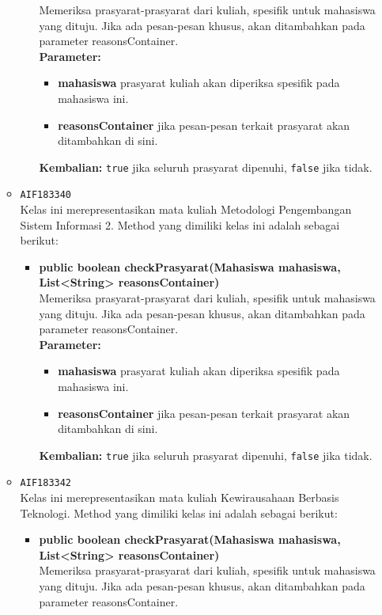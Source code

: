 \begin{enumerate}
\begin{itemize}
\begin{itemize}
Memeriksa prasyarat-prasyarat dari kuliah, spesifik untuk mahasiswa yang dituju. Jika ada pesan-pesan khusus, akan ditambahkan pada parameter reasonsContainer.\\
\textbf{Parameter:}
\begin{itemize}
\item \textbf{mahasiswa} prasyarat kuliah akan diperiksa spesifik pada mahasiswa ini.
\item \textbf{reasonsContainer} jika pesan-pesan terkait prasyarat akan ditambahkan di sini.
\end{itemize}
\textbf{Kembalian:} \texttt{true} jika seluruh prasyarat dipenuhi, \texttt{false} jika tidak.
\end{itemize}
\item \texttt{AIF183340} \\
Kelas ini merepresentasikan mata kuliah Metodologi Pengembangan Sistem Informasi 2. Method yang dimiliki kelas ini adalah sebagai berikut: 
\begin{itemize}
\item \textbf{public boolean checkPrasyarat(Mahasiswa mahasiswa, List<String> reasonsContainer)}\\
Memeriksa prasyarat-prasyarat dari kuliah, spesifik untuk mahasiswa yang dituju. Jika ada pesan-pesan khusus, akan ditambahkan pada parameter reasonsContainer.\\
\textbf{Parameter:}
\begin{itemize}
\item \textbf{mahasiswa} prasyarat kuliah akan diperiksa spesifik pada mahasiswa ini.
\item \textbf{reasonsContainer} jika pesan-pesan terkait prasyarat akan ditambahkan di sini.
\end{itemize}
\textbf{Kembalian:} \texttt{true} jika seluruh prasyarat dipenuhi, \texttt{false} jika tidak.
\end{itemize}
\item \texttt{AIF183342} \\
Kelas ini merepresentasikan mata kuliah Kewirausahaan Berbasis Teknologi. Method yang dimiliki kelas ini adalah sebagai berikut: 
\begin{itemize}
\item \textbf{public boolean checkPrasyarat(Mahasiswa mahasiswa, List<String> reasonsContainer)}\\
Memeriksa prasyarat-prasyarat dari kuliah, spesifik untuk mahasiswa yang dituju. Jika ada pesan-pesan khusus, akan ditambahkan pada parameter reasonsContainer.\\

\end{itemize}
\end{itemize}
\end{enumerate}
